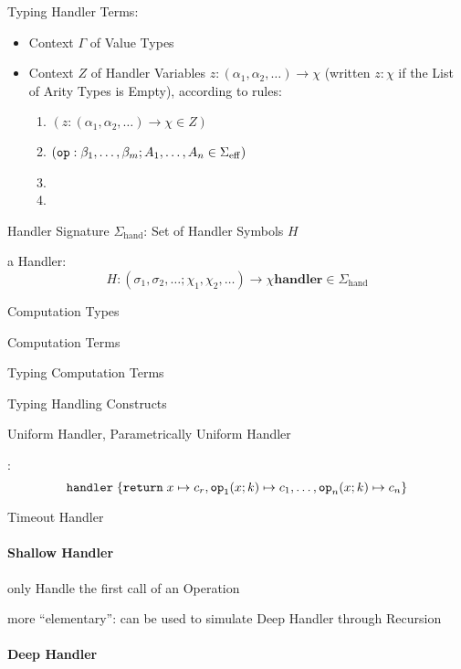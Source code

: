 Typing Handler Terms:
\begin{itemize}
  \item Context $\Gamma$ of Value Types
  \item Context $Z$ of Handler Variables $z : (\alpha_1, \alpha_2,
    \ldots) \rightarrow \chi$ (written $z:\chi$ if the List of Arity
    Types is Empty), according to rules:
    \begin{enumerate}
      \item $(z:(\alpha_1, \alpha_2, \ldots) \rightarrow \chi \in Z)$
      \item $(\mathtt{op}:\beta_1, \ldots, \beta_m; A_1, \ldots, A_n \in
        \Sigma_\mathrm{eff})$
      \item %
      \item %
    \end{enumerate}
\end{itemize}

Handler Signature $\Sigma_\mathrm{hand}$: Set of Handler Symbols $H$

a Handler:
\[
  H : (\sigma_1, \sigma_2, \ldots; \chi_1, \chi_2, \ldots)
    \rightarrow \chi \mathbf{handler} \in \Sigma_\mathrm{hand}
\]

Computation Types

Computation Terms

Typing Computation Terms

Typing Handling Constructs

Uniform Handler, Parametrically Uniform Handler
\cite{plotkin-pretnar09}


\cite{pretnar15}:
\[
  \mathtt{handler}\; \{ \mathtt{return}\; x
          \mapsto c_r, \mathtt{op}_1(x;k) \mapsto c_1, \ldots,
          \mathtt{op}_n(x;k) \mapsto c_n \}
\]


\asterism


Timeout Handler



\paragraph{Shallow Handler}\label{sec:shallow_handler}\hfill

only Handle the first call of an Operation

more ``elementary'': can be used to simulate Deep Handler through
Recursion \cite{pretnar15}



\paragraph{Deep Handler}\label{sec:deep_handler}\hfill

